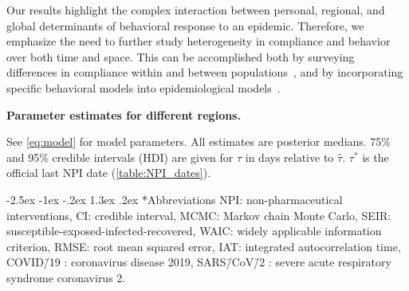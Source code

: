 \documentclass[12pt]{extarticle}
\makeatletter
\renewcommand\section{\@startsection {section}{1}{\z@}%
     {-2.5ex \@plus -1ex \@minus -.2ex}%
     {1.3ex \@plus.2ex}%
    {\Large\bfseries}}
\newcommand{\covid}{COVID\=/19 }
\newcommand{\sars}{SARS\=/CoV\=/2 }
\makeatother
\begin{document}
Our results highlight the complex interaction between personal, regional, and global determinants of behavioral response to an epidemic.
Therefore, we emphasize the need to further study heterogeneity in compliance and behavior over both time and space. This can be accomplished both by surveying differences in compliance within and between populations~\citep{Atchison2020}, and by incorporating specific behavioral models into epidemiological models~\citep{Arthur2020,Fenichela2011,Walters2013}.



\begin{landscape}
\begin{table}[]
\centering
\caption{
\textbf{Parameter estimates for different regions.}}
\footnotesize{

}
\caption*{
See \autoref{eq:model} for model parameters.
All estimates are posterior medians.
75\% and 95\% credible intervals (HDI) are given for $\tau$ in days relative to $\hat{\tau}$.
$\tau^*$ is the official last NPI date (\autoref{table:NPI_dates}).
}
\label{table:estimated-params}
\end{table}
\end{landscape}



{\small
\section*{Abbreviations}
NPI: non-pharmaceutical interventions, CI: credible interval, MCMC: Markov chain Monte Carlo, SEIR: susceptible-exposed-infected-recovered, WAIC: widely applicable information criterion, RMSE: root mean squared error, IAT: integrated autocorrelation time, \covid: coronavirus disease 2019, \sars: severe acute respiratory syndrome coronavirus 2.
}
\end{document}
